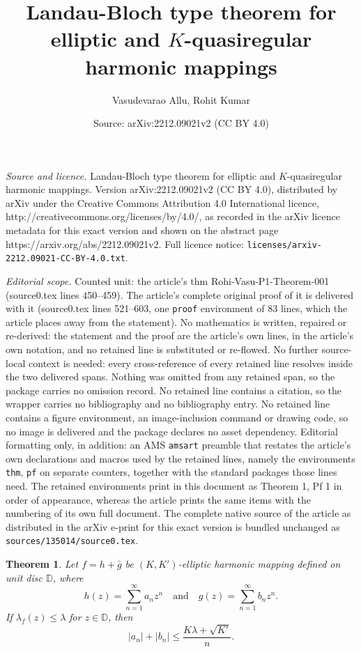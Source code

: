 \documentclass[10pt,a4paper]{amsart}
\title{Landau-Bloch type theorem for elliptic and $K$-quasiregular harmonic mappings}
\author{Vasudevarao Allu, Rohit Kumar}
\date{Source: arXiv:2212.09021v2 (CC BY 4.0)}
\newtheorem{thm}{Theorem}
\begin{document}
\maketitle

\noindent\emph{Source and licence.} Landau-Bloch type theorem for elliptic and $K$-quasiregular harmonic mappings. Version arXiv:2212.09021v2 (CC BY 4.0), distributed by arXiv under the Creative Commons Attribution 4.0 International licence, http://creativecommons.org/licenses/by/4.0/, as recorded in the arXiv licence metadata for this exact version and shown on the abstract page https://arxiv.org/abs/2212.09021v2. Full licence notice: \texttt{licenses/arxiv-2212.09021-CC-BY-4.0.txt}.\par\smallskip

\noindent\textit{Editorial scope.} Counted unit: the article's thm Rohi-Vasu-P1-Theorem-001 (source0.tex lines 450--459). The article's complete original proof of it is delivered with it (source0.tex lines 521--603, one \texttt{proof} environment of 83 lines, which the article places away from the statement). No mathematics is written, repaired or re-derived: the statement and the proof are the article's own lines, in the article's own notation, and no retained line is substituted or re-flowed.  No further source-local context is needed: every cross-reference of every retained line resolves inside the two delivered spans.  Nothing was omitted from any retained span, so the package carries no omission record.  No retained line contains a citation, so the wrapper carries no bibliography and no bibliography entry.  No retained line contains a figure environment, an image-inclusion command or drawing code, so no image is delivered and the package declares no asset dependency.  Editorial formatting only, in addition: an AMS \texttt{amsart} preamble that restates the article's own declarations and macros used by the retained lines, namely the environments \texttt{thm}, \texttt{pf} on separate counters, together with the standard packages those lines need.  The retained environments print in this document as Theorem 1, Pf 1 in order of appearance, whereas the article prints the same items with the numbering of its own full document.  The complete native source of the article as distributed in the arXiv e-print for this exact version is bundled unchanged as \texttt{sources/135014/source0.tex}.
\begin{thm} \label{Rohi-Vasu-P1-Theorem-001}
 Let $f=h+\bar{g}$ be  $(K, K')$-elliptic harmonic mapping defined on unit disc $\mathbb{D}$, where 
 \begin{equation}\label{Rohi-Vasu-P1-eq-01}
 h(z)=\sum_{n=1}^{\infty} a_n z^n \quad \text{and} \quad g(z)=\sum_{n=1}^{\infty} b_n z^n.
 \end{equation}
If $\lambda_f(z) \leq \lambda$ for $z \in \mathbb{D}$, then
\begin{equation}\label{Rohi-Vasu-P1-eq-02}
\left|a_n\right|+\left|b_n\right| \leq \frac{K \lambda+\sqrt{K'}}{n}.
\end{equation}
\end{thm} 
\end{document}
